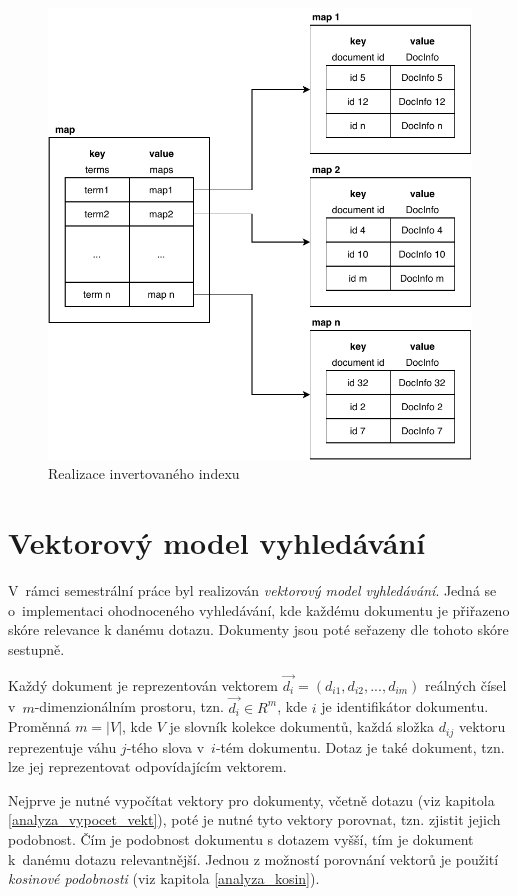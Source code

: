 \documentclass[
11pt,
a4paper,
pdftex,
czech,
titlepage
]{report}
\begin{document}
\begin{figure}[!ht]
	\centering
	\includegraphics[scale=0.93]{img/invertedIndex.pdf}
	\caption{Realizace invertovaného indexu}
	\label{inv_index_analyza}
\end{figure}

\section{Vektorový model vyhledávání}
V~rámci semestrální práce byl realizován \textit{vektorový model vyhledávání}. Jedná se o~implementaci ohodnoceného vyhledávání, kde každému dokumentu je přiřazeno skóre relevance k danému dotazu. Dokumenty jsou poté seřazeny dle tohoto skóre sestupně.

Každý dokument je reprezentován vektorem $\vec{d_i} = (d_{i1}, d_{i2}, ..., d_{im})$ reálných čísel v~$m$-dimenzionálním prostoru, tzn. $\vec{d_i}\in R^{m}$, kde $i$ je identifikátor dokumentu. Proměnná $m = |V|$, kde $V$ je slovník kolekce dokumentů, každá složka $d_{ij}$ vektoru reprezentuje váhu $j$-tého slova v~$i$-tém dokumentu. Dotaz je také dokument, tzn. lze jej reprezentovat odpovídajícím vektorem.

Nejprve je nutné vypočítat vektory pro dokumenty, včetně dotazu (viz kapitola \ref{analyza_vypocet_vekt}), poté je nutné tyto vektory porovnat, tzn. zjistit jejich podobnost. Čím je podobnost dokumentu s dotazem vyšší, tím je dokument k~danému dotazu relevantnější. Jednou z možností porovnání vektorů je použití \textit{kosinové podobnosti} (viz kapitola \ref{analyza_kosin}).
\end{document}
